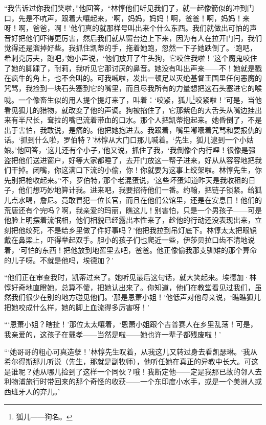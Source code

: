 \par “我告诉过你我们笑啦，”他回答，“林惇他们听见我们了，就一起像箭似的冲到门口，先是不吭声，跟着大嚷起来，‘啊，妈妈，妈妈！啊，爸爸！啊，妈妈！来呀！啊，爸爸，啊！’他们真的就那样号叫出来个什么东西。我们就做出可怕的声音好把他们吓得更厉害，然后我们就从窗台边上下来，因为有人在拉开门闩，我们觉得还是溜掉好些。我抓住凯蒂的手，拖着她跑，忽然一下子她跌倒了。‘跑吧，希刺克厉夫，跑吧，’她小声说，‘他们放开了牛头狗，它咬住我啦！’这个魔鬼咬住了她的脚踝了，耐莉，我听见它那讨厌的鼻音。她没有叫出声来——不！她就是戳在疯牛的角上，也不会叫的。可我喊啦，发出一顿足以灭绝基督王国里任何恶魔的咒骂，我捡到一块石头塞到它的嘴里，而且尽我所有的力量想把这石头塞进它的喉咙。一个像畜生似的用人提个提灯来了，叫着：‘咬紧，狐儿\footnote{狐儿——狗名。}咬紧啦！’可是，当他看见狐儿的猎物，就改变了他的声调。狗被掐住了，它那紫色的大舌头从嘴边挂出来有半尺长，耷拉的嘴巴流着带血的口水。那个人把凯蒂抱起来。她昏倒了，不是出于害怕，我敢说，是痛的。他把她抱进去。我跟着，嘴里嘟囔着咒骂和要报仇的话。‘抓到什么啦，罗伯特？’林惇从大门口那儿喊着。‘先生，狐儿逮到一个小姑娘。’他回答，‘这儿还有个小子，’他又说，抓住了我，‘我倒像个内行哩！很像是强盗把他们送进窗户，好等大家都睡了，去开门放这一帮子进来，好从从容容地把我们干掉。闭嘴，你这满口下流的小偷，你！你就要为这事上绞架啦。林惇先生，你先别把枪收起来。'‘不，罗伯特，’那个老混蛋说，‘这些坏蛋知道昨天是我收租的日子，他们想巧妙地算计我。进来吧，我要招待他们一番。约翰，把链子锁紧。给狐儿点水喝，詹尼。竟敢冒犯一位长官，而且在他们公馆里，还是在安息日！他们的荒唐还有个完吗？啊，我亲爱的玛丽，瞧这儿！别害怕，只是一个男孩子——可是他脸上明摆着流氓相，他们相貌已经露出本性来了，趁他的行动还没表现出来，立刻把他绞死，不是给乡里做了件好事吗？’他把我拉到吊灯底下。林惇太太把眼镜戴在鼻梁上，吓得举起双手。胆小的孩子们也爬近一些，伊莎贝拉口齿不清地说着，‘可怕的东西！把他放到地窖里去吧，爸爸。他正像偷我那支驯雉的那个算命的儿子呀。不就是他吗，埃德加？’
\par “他们正在审查我时，凯蒂过来了。她听见最后这句话，就大笑起来。埃德加·林惇好奇地直瞪她，总算不傻，把她认出来了。你知道，他们在教堂看见过我们，虽然我们很少在别的地方碰见他们。‘那是恩萧小姐！’他低声对他母亲说，‘瞧瞧狐儿把她咬成什么样，她的脚上血流得多厉害呀！’
\par “‘恩萧小姐？瞎扯！’那位太太嚷着，‘恩萧小姐跟个吉普赛人在乡里乱荡！可是，我亲爱的，这孩子在戴孝——当然是啦——她也许一辈子都残废啦！’
\par “‘她哥哥的粗心可真造孽！’林惇先生叹着，从我这儿又转过身去看凯瑟琳。‘我从希尔得斯那儿听说（先生，那就是副牧师），他听任她在真正的异教中长大。可这是谁呢？她从哪儿捡到了这样一个同伙？哦！我断定他——定是我那已故的邻人去利物浦旅行时带回来的那个奇怪的收获——一个东印度小水手，或是一个美洲人或西班牙人的弃儿。’
